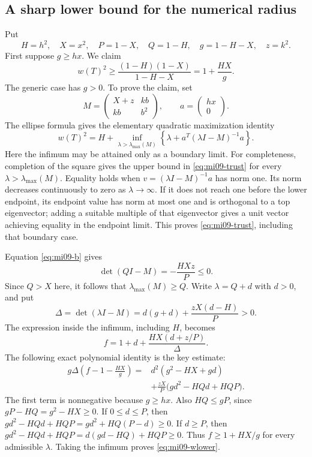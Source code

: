 \documentclass[10pt,a4paper]{article}
\theoremstyle{remark}
\begin{document}
\subsection{A sharp lower bound for the numerical radius}
Put
\[
 H=h^2,\quad X=x^2,\quad P=1-X,\quad Q=1-H,\quad
 g=1-H-X,\quad z=k^2.
\]
First suppose $g\geq hx$. We claim
\begin{equation}\label{eq:mi09-wlower}
 w(T)^2\geq\frac{(1-H)(1-X)}{1-H-X}
 =1+\frac{HX}{g}.
\end{equation}
The generic case has $g>0$. To prove the claim, set
\[
 M=\begin{pmatrix}X+z&kb\\kb&b^2\end{pmatrix},\qquad a=\begin{pmatrix}hx\\0\end{pmatrix}.
\]
The ellipse formula gives the elementary quadratic maximization identity
\begin{equation}\label{eq:mi09-trust}
 w(T)^2=H+\inf_{\lambda>\lambda_{\max}(M)}
 \left\{\lambda+a^T(\lambda I-M)^{-1}a\right\}.
\end{equation}
Here the infimum may be attained only as a boundary limit. For completeness, completion of the square gives the upper bound in \eqref{eq:mi09-trust} for every $\lambda>\lambda_{\max}(M)$. Equality holds when $v=(\lambda I-M)^{-1}a$ has norm one. Its norm decreases continuously to zero as $\lambda\to\infty$. If it does not reach one before the lower endpoint, its endpoint value has norm at most one and is orthogonal to a top eigenvector; adding a suitable multiple of that eigenvector gives a unit vector achieving equality in the endpoint limit. This proves \eqref{eq:mi09-trust}, including that boundary case.

Equation \eqref{eq:mi09-b} gives
\[
 \det(QI-M)=-\frac{HXz}{P}\leq0.
\]
Since $Q>X$ here, it follows that $\lambda_{\max}(M)\geq Q$. Write $\lambda=Q+d$ with $d>0$, and put
\[
 \Delta=\det(\lambda I-M)=d(g+d)+\frac{zX(d-H)}P>0.
\]
The expression inside the infimum, including $H$, becomes
\[
 f=1+d+\frac{HX(d+z/P)}{\Delta}.
\]
The following exact polynomial identity is the key estimate:
\begin{align*}
 g\Delta\left(f-1-\frac{HX}{g}\right)
 ={}&d^2(g^2-HX+gd)\\
 &+\frac{zX}{P}\bigl(gd^2-HQd+HQP\bigr).
\end{align*}
The first term is nonnegative because $g\geq hx$. Also
$HQ\leq gP$, since $gP-HQ=g^2-HX\geq0$.
If $0\leq d\leq P$, then
$gd^2-HQd+HQP=gd^2+HQ(P-d)\geq0$.
If $d\geq P$, then
$gd^2-HQd+HQP=d(gd-HQ)+HQP\geq0$.
Thus $f\geq1+HX/g$ for every admissible $\lambda$. Taking the infimum proves \eqref{eq:mi09-wlower}.
\end{document}
